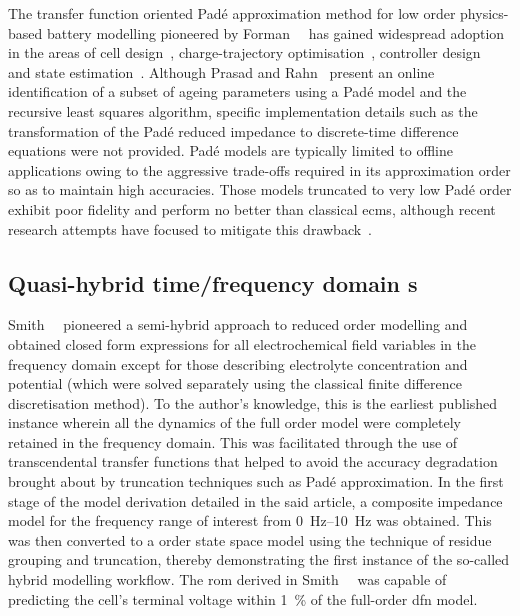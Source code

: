 The     transfer     function     oriented     Padé     approximation     method
for    low    order    physics-based     battery    modelling    pioneered    by
Forman~\etal{}~\cite{Forman2011a}    has   gained    widespread   adoption    in
the    areas     of    cell     design~\cite{Marcicki2013},    charge-trajectory
optimisation~\cite{Bashash2010},    controller    design~\cite{Perez2015}    and
state    estimation~\cite{Marcicki2013,Moura2012}.     Although    Prasad    and
Rahn~\cite{Prasad2013} present  an online identification  of a subset  of ageing
parameters  using  a Padé  model  and  the  recursive least  squares  algorithm,
specific implementation details  such as the transformation of  the Padé reduced
impedance to discrete-time  difference equations were not  provided. Padé models
are typically limited to offline applications owing to the aggressive trade-offs
required in  its approximation order  so as  to maintain high  accuracies. Those
models truncated  to very low  Padé order exhibit  poor fidelity and  perform no
better  than  classical  \glspl{ecm},  although recent  research  attempts  have
focused to mitigate this drawback~\cite{Yuan2017a,Yuan2017}.


\subsection{Quasi-hybrid time/frequency domain s}\label{subsec:quasiroms}

Smith~\etal{}~\cite{Smith2007} pioneered a semi-hybrid approach to reduced order
modelling and  obtained closed  form expressions  for all  electrochemical field
variables  in  the frequency  domain  except  for those  describing  electrolyte
concentration and  potential (which were  solved separately using  the classical
finite  difference  discretisation  method).  To the  author's  knowledge,  this
is  the  earliest published  instance  wherein  all  the  dynamics of  the  full
order  model  were  completely  retained  in  the  frequency  domain.  This  was
facilitated through  the use  of transcendental  transfer functions  that helped
to  avoid  the  accuracy  degradation brought  about  by  truncation  techniques
such  as  Padé  approximation.  In  the first  stage  of  the  model  derivation
detailed in  the said  article, a  composite impedance  model for  the frequency
range  of interest  from  \SIrange{0}{10}{\hertz} was  obtained.  This was  then
converted to a  order state  space model using the technique of
residue  grouping  and  truncation,  thereby demonstrating  the  first  instance
of  the   so-called  hybrid  modelling   workflow.  The  \gls{rom}   derived  in
Smith~\etal{}~\cite{Smith2007}  was capable  of predicting  the cell's  terminal
voltage within \SI{1}{\percent} of the full-order \gls{dfn} model.

